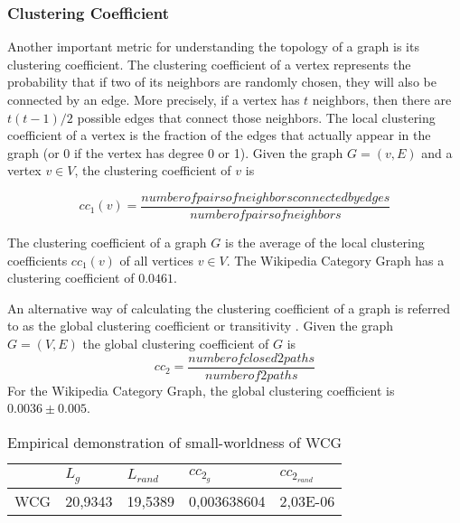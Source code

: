 \subsubsection{\hspace*{3pt} Clustering Coefficient}

Another important metric for understanding the topology of a graph is its clustering coefficient. The clustering coefficient of a vertex represents the probability that if two of its neighbors are randomly chosen, they will also be connected by an edge. More precisely, if a vertex has $t$ neighbors, then there are $t(t-1)/2$ possible edges that connect those neighbors. The local clustering coefficient of a vertex is the fraction of the edges that actually appear in the graph (or 0 if the vertex has degree 0 or 1). Given the graph $G= (v,E)$ and a vertex $v \in V$, the clustering coefficient of $v$ is 

\begin{equation}\label{eq:cc1}
cc_1(v) = \dfrac{number of pairs of neighbors connected by edges}{number of pairs of neighbors}  
\end{equation} 

The clustering coefficient of a graph $G$ is the average of the local clustering coefficients $cc_1(v)$ of all vertices $v \in V$. The Wikipedia Category Graph has a clustering coefficient of $0.0461$. 

An alternative way of calculating the clustering coefficient of a graph is referred to as the global clustering coefficient or transitivity \cite{newman2001random}. Given the graph $G = (V,E)$ the global clustering coefficient of $G$ is
\begin{equation}\label{eq:cc2}
cc_2 = \dfrac{number of closed 2paths}{number of 2paths}
\end{equation} For the Wikipedia Category Graph, the global clustering coefficient is $0.0036\pm0.005$. 



\begin{table}[!h]
\centering
\begin{tabular}{@{}lllll@{}}
\toprule
    & $L_g$       & $L_{rand}$       & $cc_{2_g}$           & $cc_{2_{rand}}$        \\ \midrule
WCG & 20,9343 & 19,5389 & 0,003638604 & 2,03E-06 \\ \bottomrule
\end{tabular}
\caption{Empirical demonstration of small-worldness of WCG }
\label{small-worldness}
\end{table}

